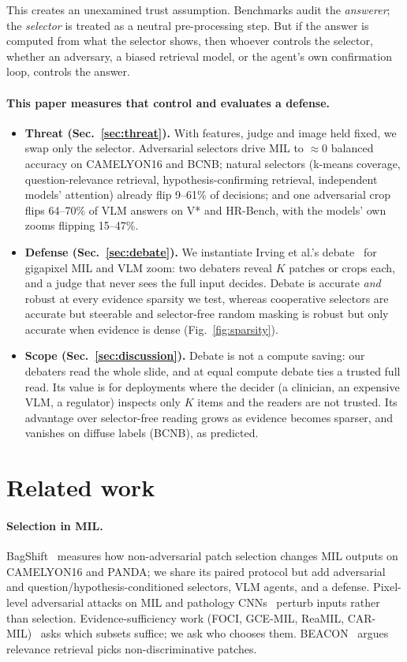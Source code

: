 \documentclass[10pt,twocolumn,letterpaper]{article}
\begin{document}
This creates an unexamined trust assumption. Benchmarks audit the \emph{answerer}; the \emph{selector} is treated as a neutral pre-processing step. But if the answer is computed from what the selector shows, then whoever controls the selector, whether an adversary, a biased retrieval model, or the agent's own confirmation loop, controls the answer.

\paragraph{This paper measures that control and evaluates a defense.}
\begin{itemize}
\item \textbf{Threat (Sec.~\ref{sec:threat}).} With features, judge and image held fixed, we swap only the selector. Adversarial selectors drive MIL to $\approx$0 balanced accuracy on CAMELYON16 and BCNB; natural selectors (k-means coverage, question-relevance retrieval, hypothesis-confirming retrieval, independent models' attention) already flip 9--61\% of decisions; and one adversarial crop flips 64--70\% of VLM answers on V* and HR-Bench, with the models' own zooms flipping 15--47\%.
\item \textbf{Defense (Sec.~\ref{sec:debate}).} We instantiate Irving et al.'s debate~\cite{irving2018debate} for gigapixel MIL and VLM zoom: two debaters reveal $K$ patches or crops each, and a judge that never sees the full input decides. Debate is accurate \emph{and} robust at every evidence sparsity we test, whereas cooperative selectors are accurate but steerable and selector-free random masking is robust but only accurate when evidence is dense (Fig.~\ref{fig:sparsity}).
\item \textbf{Scope (Sec.~\ref{sec:discussion}).} Debate is not a compute saving: our debaters read the whole slide, and at equal compute debate ties a trusted full read. Its value is for deployments where the decider (a clinician, an expensive VLM, a regulator) inspects only $K$ items and the readers are not trusted. Its advantage over selector-free reading grows as evidence becomes sparser, and vanishes on diffuse labels (BCNB), as predicted.
\end{itemize}

\section{Related work}
\paragraph{Selection in MIL.} BagShift~\cite{bagshift2026} measures how non-adversarial patch selection changes MIL outputs on CAMELYON16 and PANDA; we share its paired protocol but add adversarial and question/hypothesis-conditioned selectors, VLM agents, and a defense. Pixel-level adversarial attacks on MIL and pathology CNNs~\cite{mil_adv2022,foote2021now} perturb inputs rather than selection. Evidence-sufficiency work (FOCI, GCE-MIL, ReaMIL, CAR-MIL)~\cite{foci2026,gcemil2026,reamil2026,carmil2026} asks which subsets suffice; we ask who chooses them. BEACON~\cite{beacon2026} argues relevance retrieval picks non-discriminative patches.
\end{document}
